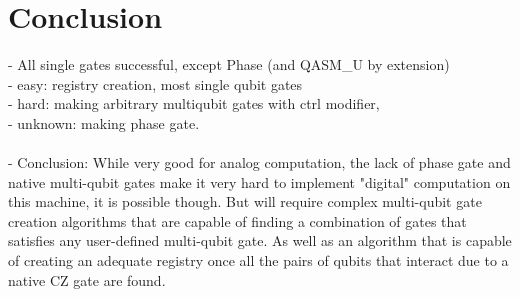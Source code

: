 \section{Conclusion}
- All single gates successful, except Phase (and QASM\_U by extension)\\ 

- easy: registry creation, most single qubit gates\\
- hard: making arbitrary multiqubit gates with ctrl modifier, \\
- unknown: making phase gate.\\ \\

- Conclusion: While very good for analog computation, the lack of phase gate and native multi-qubit gates make it very hard to implement "digital" computation
on this machine, it is possible though. But will require complex multi-qubit gate creation algorithms that are capable of finding a combination of
 gates that satisfies any user-defined multi-qubit gate. As well as an algorithm that is capable of creating an adequate registry once all the pairs of qubits 
 that interact due to a native CZ gate are found.
